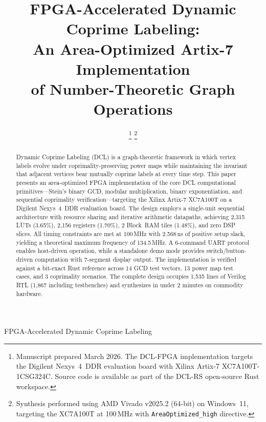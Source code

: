 \documentclass[lettersize,journal]{IEEEtran}
\begin{document}
\title{FPGA-Accelerated Dynamic Coprime Labeling:\\An Area-Optimized Artix-7 Implementation\\of Number-Theoretic Graph Operations}

\author{%
\thanks{Manuscript prepared March 2026. The DCL-FPGA implementation targets the Digilent Nexys~4~DDR evaluation board with Xilinx Artix-7 XC7A100T-1CSG324C. Source code is available as part of the DCL-RS open-source Rust workspace.}%
\thanks{Synthesis performed using AMD Vivado v2025.2 (64-bit) on Windows~11, targeting the XC7A100T at 100\,MHz with \texttt{AreaOptimized\_high} directive.}}

%
{FPGA-Accelerated Dynamic Coprime Labeling}

\maketitle

\begin{abstract}
Dynamic Coprime Labeling (DCL) is a graph-theoretic framework in which vertex labels evolve under coprimality-preserving power maps while maintaining the invariant that adjacent vertices bear mutually coprime labels at every time step. This paper presents an area-optimized FPGA implementation of the core DCL computational primitives---Stein's binary GCD, modular multiplication, binary exponentiation, and sequential coprimality verification---targeting the Xilinx Artix-7 XC7A100T on a Digilent Nexys~4~DDR evaluation board. The design employs a single-unit sequential architecture with resource sharing and iterative arithmetic datapaths, achieving 2{,}315 LUTs (3.65\%), 2{,}156 registers (1.70\%), 2 Block~RAM tiles (1.48\%), and zero DSP slices. All timing constraints are met at 100\,MHz with 2.568\,ns of positive setup slack, yielding a theoretical maximum frequency of 134.5\,MHz. A 6-command UART protocol enables host-driven operation, while a standalone demo mode provides switch/button-driven computation with 7-segment display output. The implementation is verified against a bit-exact Rust reference across 14 GCD test vectors, 13 power map test cases, and 3 coprimality scenarios. The complete design occupies 1{,}535 lines of Verilog RTL (1{,}867 including testbenches) and synthesizes in under 2 minutes on commodity hardware.
\end{abstract}
\end{document}
